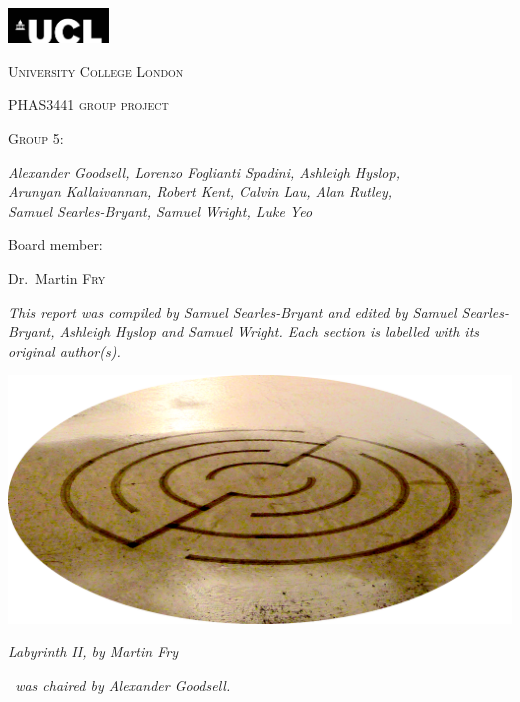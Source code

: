 \pagestyle{plain}

\begin{titlepage}
    \centering
    \includegraphics[width=0.2\textwidth]{Files/UCL}\par\vspace{1cm}
    {\scshape\LARGE University College London \par}
    \vspace{1cm}
    {\scshape PHAS3441 group project\par}
    {\scshape Group 5:~\teamname\par}
    \vspace{1.5cm}
    {\huge\bfseries {} \projectTitle\par}
    \vspace{2cm}
    {\Large\itshape Alexander Goodsell, Lorenzo Foglianti Spadini, Ashleigh Hyslop,\\ Arunyan Kallaivannan, Robert Kent, Calvin Lau, Alan Rutley,\\ Samuel Searles-Bryant, Samuel Wright, Luke Yeo\par}
    \vfill
    Board member:\par
    Dr.~Martin \textsc{Fry}

    \vfill

    {\large \thedate\par}
\end{titlepage}

{\centering
{\itshape This report was compiled by Samuel Searles-Bryant and edited by Samuel Searles-Bryant, Ashleigh Hyslop and Samuel Wright. Each section is labelled with its original author(s).\par}
\vfill
\includegraphics[width=\textwidth]{Files/labyrinth_II_ellipse}\par
{\itshape \emph{Labyrinth II}, by Martin Fry\par}
\vfill
{\itshape \teamname~was chaired by Alexander Goodsell.\par}
}

\cleardoublepage

\tableofcontents
